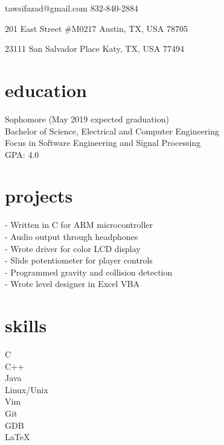 \documentclass[12pt]{cv_class}
\begin{document}
\leftskip 8pc
%
\begin{flushright}%

\vspace{0.5pc}
\contact
    {tawsifazad@gmail.com}%
    {832-840-2884}%

\address
    {Present}%
    {201 East  Street \#M0217}%
    {Austin, TX, USA}%
    {78705}%

\address
    {Permanent}%
    {23111 San Salvador Place}%
    {Katy, TX, USA}%
    {77494}%
\end{flushright}%

\vspace{1pc}
\section{education}%
Sophomore (May 2019 expected graduation) \\
Bachelor of Science, Electrical and Computer Engineering \\
Focus in Software Engineering and Signal Processing \\
GPA: 4.0 \\
\section{projects}%
- Written in C for ARM microcontroller \\
- Audio output through headphones \\
- Wrote driver for color LCD display \\
- Slide potentiometer for player controls \\
- Programmed gravity and collision detection \\
- Wrote level designer in Excel VBA \\
\section{skills}%
%
C\\
C++\\
\vspace{1pc}
Java\\
%
Linux/Unix\\
Vim\\
Git\\
GDB\\
\LaTeX\\
\hfill
\end{document}
